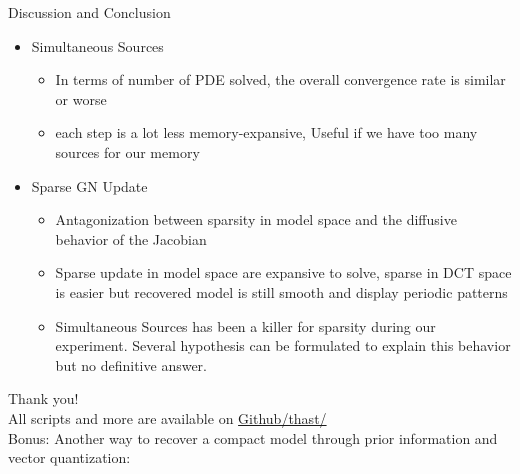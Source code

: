 \documentclass[12pt]{beamer}
\begin{document}
\begin{frame}{Discussion and Conclusion}
\begin{itemize}
  \item Simultaneous Sources
  \begin{itemize}
    \item In terms of number of PDE solved, the overall convergence rate is similar or worse
    \item each step is a lot less memory-expansive, Useful if we have too many sources for our memory
  \end{itemize}
  \item Sparse GN Update
  \begin{itemize}
    \item Antagonization between sparsity in model space and the diffusive behavior of the Jacobian
    \item Sparse update in model space are expansive to solve, sparse in DCT space is easier but recovered model is still smooth and display periodic patterns
    \item Simultaneous Sources has been a killer for sparsity during our experiment. Several hypothesis can be formulated to explain this behavior but no definitive answer.
  \end{itemize}
\end{itemize}
\end{frame}

\begin{frame}

\begin{center}
{\Huge Thank you! \\}
\vspace{10pt}
All scripts and more are available on \href{https://github.com/thast/EOSC513}{\color{blue} Github/thast/} \\
\vspace{20pt}
Bonus: Another way to recover a compact model through prior information and vector quantization:
\end{center}

\begin{figure}
\end{figure}

\end{frame}
\end{document}
